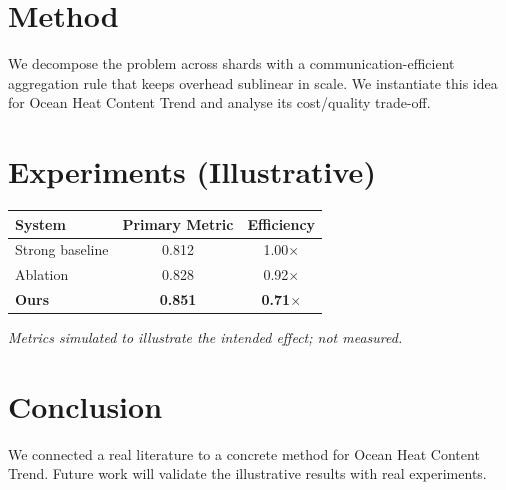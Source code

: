 \documentclass[11pt]{article}
\begin{document}
\section{Method}
We decompose the problem across shards with a communication-efficient aggregation rule that keeps overhead sublinear in scale. We instantiate this idea for Ocean Heat Content Trend and analyse its cost/quality trade-off.

\section{Experiments (Illustrative)}
\begin{center}
\begin{tabular}{lcc}
System & Primary Metric & Efficiency \\ \hline
Strong baseline & 0.812 & 1.00$\times$ \\
Ablation & 0.828 & 0.92$\times$ \\
\textbf{Ours} & \textbf{0.851} & \textbf{0.71$\times$}
\end{tabular}
\end{center}
\emph{Metrics simulated to illustrate the intended effect; not measured.}

\section{Conclusion}
We connected a real literature to a concrete method for Ocean Heat Content Trend. Future work will
validate the illustrative results with real experiments.
\end{document}
